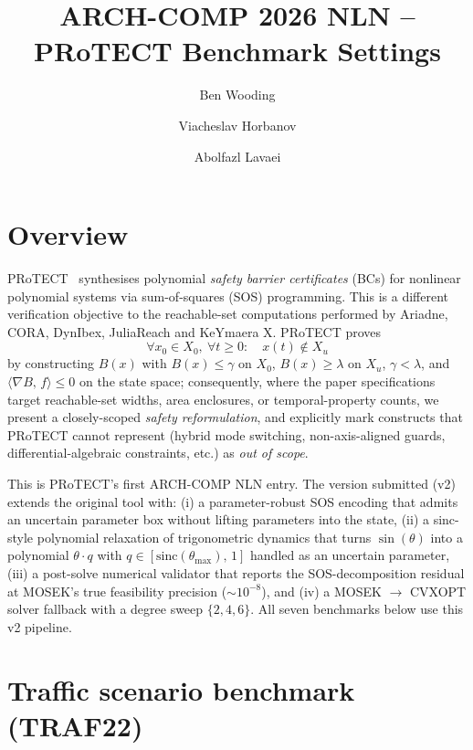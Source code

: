 \documentclass[11pt,a4paper]{article}
\title{ARCH-COMP 2026 NLN -- PRoTECT Benchmark Settings}
\author{Ben Wooding \and Viacheslav Horbanov \and Abolfazl Lavaei}
\date{}
\begin{document}
\maketitle

\section*{Overview}

PRoTECT~\cite{wooding2025iccps,wooding2025ictac} synthesises polynomial
\emph{safety barrier certificates} (BCs) for nonlinear polynomial systems via
sum-of-squares (SOS) programming. This is a different verification objective
to the reachable-set computations performed by Ariadne, CORA, DynIbex,
JuliaReach and KeYmaera X. PRoTECT proves
\[
   \forall x_0 \in X_0,\ \forall t \ge 0:\quad x(t) \notin X_u
\]
by constructing $B(x)$ with $B(x) \le \gamma$ on $X_0$, $B(x) \ge \lambda$ on
$X_u$, $\gamma < \lambda$, and $\langle \nabla B,\, f \rangle \le 0$ on
the state space; consequently, where the paper specifications target
reachable-set widths, area enclosures, or temporal-property counts, we
present a closely-scoped \emph{safety reformulation}, and explicitly mark
constructs that PRoTECT cannot represent (hybrid mode switching,
non-axis-aligned guards, differential-algebraic constraints, etc.) as
\emph{out of scope}.

This is PRoTECT's first ARCH-COMP NLN entry. The version submitted (v2)
extends the original tool with: (i) a parameter-robust SOS encoding that
admits an uncertain parameter box without lifting parameters into the
state, (ii) a sinc-style polynomial relaxation of trigonometric dynamics
that turns $\sin(\theta)$ into a polynomial $\theta \cdot q$ with
$q \in [\mathrm{sinc}(\theta_{\max}),\, 1]$ handled as an uncertain
parameter, (iii) a post-solve numerical validator that reports the
SOS-decomposition residual at MOSEK's true feasibility precision
(${\sim}10^{-8}$), and (iv) a MOSEK $\to$ CVXOPT solver fallback with a
degree sweep $\{2, 4, 6\}$. All seven benchmarks below use this v2
pipeline.

\section{Traffic scenario benchmark (TRAF22)}
\end{document}
